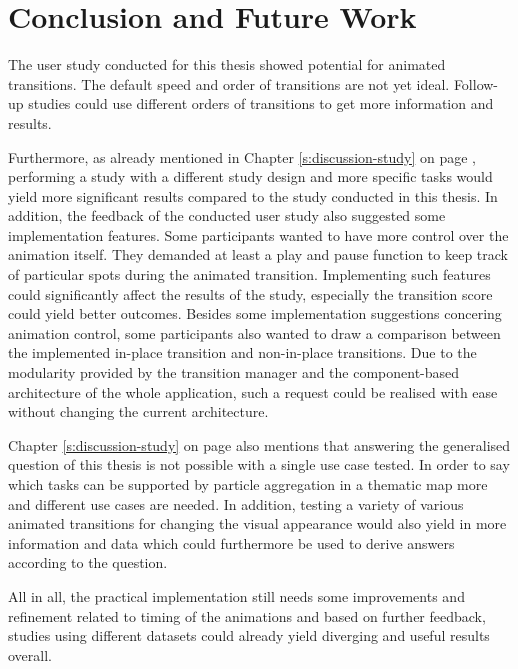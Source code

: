 \section{Conclusion and Future Work}
\label{s:outlook}
\cbstart
The user study conducted for this thesis showed potential for animated transitions. The default speed and order of transitions are not yet ideal. Follow-up studies could use different orders of transitions to get more information and results.

Furthermore, as already mentioned in Chapter \ref{s:discussion-study} on page \pageref{s:discussion-study}, performing a study with a different study design and more specific tasks would yield more significant results compared to the study conducted in this thesis. In addition, the feedback of the conducted user study also suggested some implementation features. Some participants wanted to have more control over the animation itself. They demanded at least a play and pause function to keep track of particular spots during the animated transition. Implementing such features could significantly affect the results of the study, especially the transition score could yield better outcomes. Besides some implementation suggestions concering animation control, some participants also wanted to draw a comparison between the implemented in-place transition and non-in-place transitions. Due to the modularity provided by the transition manager and the component-based architecture of the whole application, such a request could be realised with ease without changing the current architecture.

Chapter \ref{s:discussion-study} on page \pageref{s:discussion-study} also mentions that answering the generalised question of this thesis is not possible with a single use case tested. In order to say which tasks can be supported by particle aggregation in a thematic map more and different use cases are needed. In addition, testing a variety of various animated transitions for changing the visual appearance would also yield in more information and data which could furthermore be used to derive answers according to the question.

All in all, the practical implementation still needs some improvements and refinement related to timing of the animations and based on further feedback, studies using different datasets could already yield diverging and useful results overall.
\cbend
